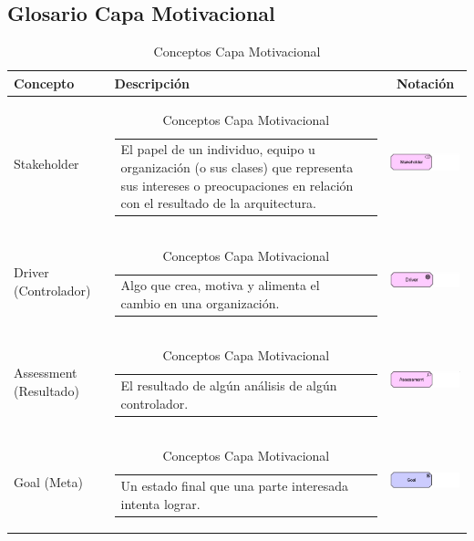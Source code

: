 \newpage

\subsection{Glosario Capa Motivacional}

\begin{longtable}[c]{|p{2.5cm}|l|c|}
	\caption{Conceptos Capa Motivacional}
	\label{my-label}\\
	\hline
	\textbf{Concepto} 			& \textbf{Descripción}                                                                                                                                            & \textbf{Notación} \\ \hline
	\endhead
	Stakeholder					& \begin{tabular}[c]{p{7cm}@{}l@{}}El papel de un individuo, equipo u organización (o sus clases) que representa sus intereses o preocupaciones en relación con el resultado de la arquitectura.\end{tabular}                                                    & \includegraphics[width=35mm]{arquitectura/adm_lenguaje/imgs/motivational/Stakeholder}           \\ \hline
	Driver (Controlador)		& \begin{tabular}[c]{p{7cm}@{}l@{}}Algo que crea, motiva y alimenta el cambio en una organización.\end{tabular} & \includegraphics[width=35mm]{arquitectura/adm_lenguaje/imgs/motivational/Diver}          \\ \hline
	Assessment (Resultado)		& \begin{tabular}[c]{p{7cm}@{}l@{}}El resultado de algún análisis de algún controlador.\end{tabular} & \includegraphics[width=35mm]{arquitectura/adm_lenguaje/imgs/motivational/Assessment}          \\ \hline
	Goal (Meta)					& \begin{tabular}[c]{p{7cm}@{}l@{}}Un estado final que una parte interesada intenta lograr.\end{tabular} & \includegraphics[width=35mm]{arquitectura/adm_lenguaje/imgs/motivational/Goal}          \\ \hline

\end{longtable}
